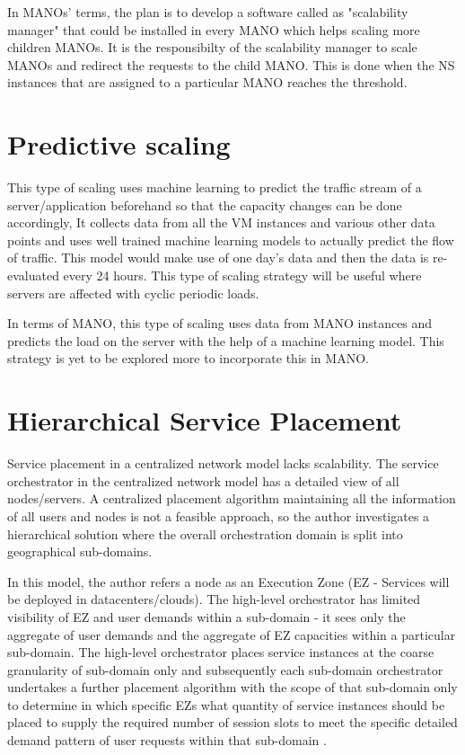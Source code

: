 In MANOs' terms, the plan is to develop a software called as "scalability manager" that could be installed in every MANO which helps scaling more children MANOs. It is the responsibilty of the scalability manager to scale MANOs and redirect the requests to the child MANO. This is done when the NS instances that are assigned to a particular MANO reaches the threshold.



\section{Predictive scaling}
This type of scaling uses machine learning to predict the traffic stream of a server/application beforehand so that the capacity changes can be done accordingly, It collects data from all the VM instances and various other data points and uses well trained machine learning models to actually predict the flow of traffic. This model would make use of one day's data and then the data is re-evaluated every 24 hours. This type of scaling strategy will be useful where servers are affected with cyclic periodic loads.

In terms of MANO, this type of scaling uses data from MANO instances and predicts the load on the server with the help of a machine learning model. This strategy is yet to be explored more to incorporate this in MANO.



\section{Hierarchical Service Placement}
Service placement in a centralized network model lacks scalability. The service orchestrator in the centralized network model has a detailed view of all nodes/servers. A centralized placement algorithm maintaining all the information of all users and nodes is not a feasible approach, so the author investigates a hierarchical solution where the overall orchestration domain is split into geographical sub-domains.

In this model, the author refers a node as an Execution Zone (EZ - Services will be deployed in datacenters/clouds). The high-level orchestrator has limited visibility of EZ and user demands within a sub-domain - it sees only the aggregate of user demands and the aggregate of EZ capacities within a particular sub-domain. The high-level orchestrator places service instances at the coarse granularity of sub-domain only and subsequently each sub-domain orchestrator undertakes a further placement algorithm with the scope of that sub-domain only to determine in which specific EZs what quantity of service instances should be placed to supply the required number of session slots to meet the specific detailed demand pattern of user requests within that sub-domain \cite{maini_hierarchical_2016}.
